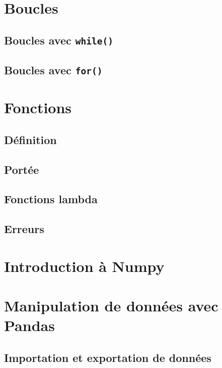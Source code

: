 \documentclass[12pt,]{book}
\numberwithin{equation}{section}
\numberwithin{countremarque}{section}
\begin{document}
\chapter{Boucles}\label{boucles}

\section{\texorpdfstring{Boucles avec
\texttt{while()}}{Boucles avec while()}}\label{boucles-avec-while}

\section{\texorpdfstring{Boucles avec
\texttt{for()}}{Boucles avec for()}}\label{boucles-avec-for}

\chapter{Fonctions}\label{fonctions}

\section{Définition}\label{definition}

\section{Portée}\label{portee}

\section{Fonctions lambda}\label{fonctions-lambda}

\section{Erreurs}\label{erreurs}

\chapter{Introduction à Numpy}\label{numpy}

\chapter{Manipulation de données avec Pandas}\label{pandas}

\section{Importation et exportation de
données}\label{importation-et-exportation-de-donnees}
\end{document}
